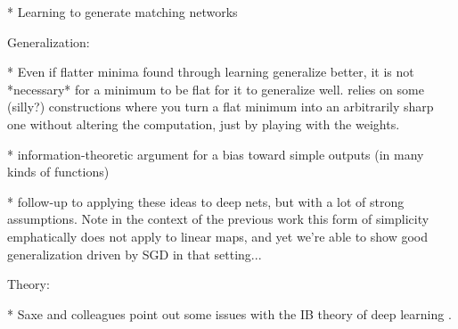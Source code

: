 * Learning to generate matching networks \citep{Li2019a}

Generalization:

* Even if flatter minima found through learning generalize better, it is not *necessary* for a minimum to be flat for it to generalize well. relies on some (silly?) constructions where you turn a flat minimum into an arbitrarily sharp one without altering the computation, just by playing with the weights. \citep{Dinh2017} 

* information-theoretic argument for a bias toward simple outputs (in many kinds of functions) \citep{Dingle2018}

* follow-up to \citep{Dingle2018} applying these ideas to deep nets, but with a lot of strong assumptions. \citep{Perez2019} Note in the context of the previous work this form of simplicity emphatically does not apply to linear maps, and yet we're able to show good generalization driven by SGD in that setting...  

Theory:

* Saxe and colleagues point out some issues with the IB theory of deep learning \citep{Saxe2018a}.


